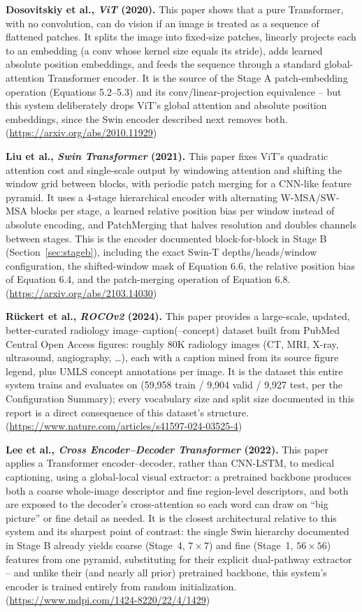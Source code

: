 \documentclass[12pt]{article}
\begin{document}
\textbf{Dosovitskiy et al., \emph{ViT} (2020).} This paper shows that a pure Transformer, with no convolution, can do vision if an image is treated as a sequence of flattened patches. It splits the image into fixed-size patches, linearly projects each to an embedding (a conv whose kernel size equals its stride), adds learned absolute position embeddings, and feeds the sequence through a standard global-attention Transformer encoder. It is the source of the Stage A patch-embedding operation (Equations 5.2--5.3) and its conv/linear-projection equivalence -- but this system deliberately drops ViT's global attention and absolute position embeddings, since the Swin encoder described next removes both. (\url{https://arxiv.org/abs/2010.11929})

\textbf{Liu et al., \emph{Swin Transformer} (2021).} This paper fixes ViT's quadratic attention cost and single-scale output by windowing attention and shifting the window grid between blocks, with periodic patch merging for a CNN-like feature pyramid. It uses a 4-stage hierarchical encoder with alternating W-MSA/SW-MSA blocks per stage, a learned relative position bias per window instead of absolute encoding, and PatchMerging that halves resolution and doubles channels between stages. This is the encoder documented block-for-block in Stage B (Section~\ref{sec:stageb}), including the exact Swin-T depths/heads/window configuration, the shifted-window mask of Equation 6.6, the relative position bias of Equation 6.4, and the patch-merging operation of Equation 6.8. (\url{https://arxiv.org/abs/2103.14030})

\textbf{R\"uckert et al., \emph{ROCOv2} (2024).} This paper provides a large-scale, updated, better-curated radiology image--caption(--concept) dataset built from PubMed Central Open Access figures: roughly 80K radiology images (CT, MRI, X-ray, ultrasound, angiography, \ldots), each with a caption mined from its source figure legend, plus UMLS concept annotations per image. It is the dataset this entire system trains and evaluates on (59,958 train / 9,904 valid / 9,927 test, per the Configuration Summary); every vocabulary size and split size documented in this report is a direct consequence of this dataset's structure. (\url{https://www.nature.com/articles/s41597-024-03525-4})

\textbf{Lee et al., \emph{Cross Encoder--Decoder Transformer} (2022).} This paper applies a Transformer encoder--decoder, rather than CNN-LSTM, to medical captioning, using a global-local visual extractor: a pretrained backbone produces both a coarse whole-image descriptor and fine region-level descriptors, and both are exposed to the decoder's cross-attention so each word can draw on ``big picture'' or fine detail as needed. It is the closest architectural relative to this system and its sharpest point of contrast: the single Swin hierarchy documented in Stage B already yields coarse (Stage~4, $7\times7$) and fine (Stage~1, $56\times56$) features from one pyramid, substituting for their explicit dual-pathway extractor -- and unlike their (and nearly all prior) pretrained backbone, this system's encoder is trained entirely from random initialization. (\url{https://www.mdpi.com/1424-8220/22/4/1429})
\end{document}
